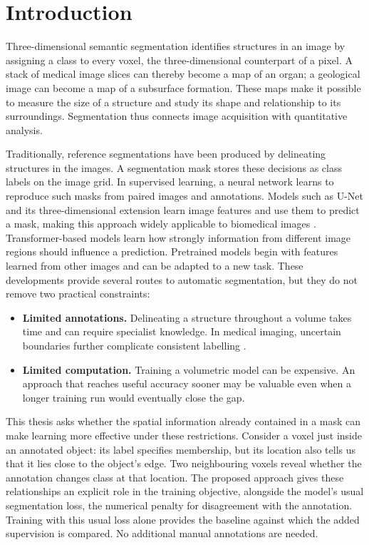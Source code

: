 \documentclass[12pt,a4paper]{article}
\begin{document}
\clearpage
\fi
\setcounter{tocdepth}{2}
\tableofcontents
\clearpage
\section{Introduction}\label{sec:introduction}
\label{sec:motivation}\label{sec:research-questions}

Three-dimensional semantic segmentation identifies structures in an image
by assigning a class to every voxel, the three-dimensional counterpart
of a pixel. A stack of medical image slices can thereby become a map of
an organ; a geological image can become a map of a subsurface formation.
These maps make it possible to measure the size of a structure and study
its shape and relationship to its surroundings. Segmentation thus connects
image acquisition with quantitative analysis.

Traditionally, reference segmentations have been produced by delineating
structures in the images. A segmentation mask stores these decisions as
class labels on the image grid. In supervised learning, a neural network
learns to reproduce such masks from paired images and annotations.
Models such as U-Net and its three-dimensional extension learn image
features and use them to predict a mask, making this approach widely
applicable to biomedical images \cite{ronneberger2015unet,cicek2016unet}.
Transformer-based models learn how strongly information from different
image regions should influence a prediction. Pretrained models begin
with features learned from other images and can be adapted to a new task. These developments provide several routes to automatic
segmentation, but they do not remove two practical constraints:
\begin{itemize}
\item \textbf{Limited annotations.} Delineating a structure throughout a
volume takes time and can require specialist knowledge. In medical
imaging, uncertain boundaries further complicate consistent labelling
\cite{wang2021annotation}.
\item \textbf{Limited computation.} Training a volumetric model can be
expensive. An approach that reaches useful accuracy sooner may be
valuable even when a longer training run would eventually close the gap.
\end{itemize}

This thesis asks whether the spatial information already contained in a mask
can make learning more effective under these restrictions. Consider a voxel
just inside an annotated object: its label specifies membership, but its
location also tells us that it lies close to the object's edge. Two
neighbouring voxels reveal whether the annotation changes class at that
location. The proposed approach gives these relationships an explicit role
in the training objective, alongside the model's usual segmentation loss,
the numerical penalty for disagreement with the annotation. Training with
this usual loss alone provides the baseline against which the added
supervision is compared. No additional manual annotations are needed.
\end{document}
